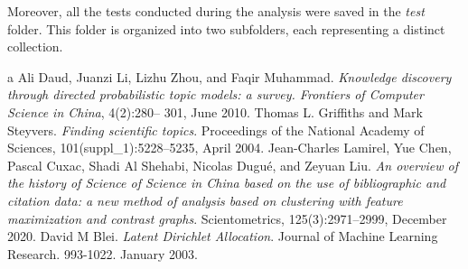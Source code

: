 \documentclass[10pt]{article} %
\begin{document}
Moreover, all the tests conducted during the analysis were saved in the \textit{test} folder. This folder is organized into two subfolders, each representing a distinct collection.

\begin{thebibliography}
	a
	 Ali Daud, Juanzi Li, Lizhu Zhou, and Faqir Muhammad. \emph{Knowledge discovery through
	directed probabilistic topic models: a survey. Frontiers of Computer Science in China}, 4(2):280–
	301, June 2010.
	 Thomas L. Griffiths and Mark Steyvers. \emph{Finding scientific topics}. Proceedings of the National
	Academy of Sciences, 101(suppl\_1):5228–5235, April 2004.
	 Jean-Charles Lamirel, Yue Chen, Pascal Cuxac, Shadi Al Shehabi, Nicolas Dugué, and Zeyuan
	Liu. \emph{An overview of the history of Science of Science in China based on the use of bibliographic
	and citation data: a new method of analysis based on clustering with feature maximization
	and contrast graphs}. Scientometrics, 125(3):2971–2999, December 2020.
	 David M Blei. \emph{Latent Dirichlet Allocation}. Journal of Machine Learning Research. 993-1022. January 2003.
\end{thebibliography}
\end{document}
